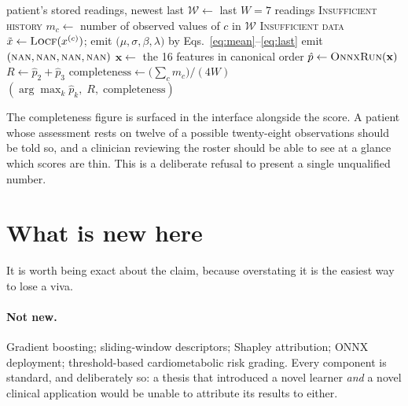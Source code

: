 \documentclass[11pt,a4paper]{article}
\newcommand{\sbp}{\mathrm{sbp}}
\newcommand{\dbp}{\mathrm{dbp}}
\newcommand{\glu}{\mathrm{glu}}
\newcommand{\hr}{\mathrm{hr}}
\begin{document}
\begin{algorithm}[htbp]
\caption{On-device risk assessment}
\label{alg:infer}
\begin{algorithmic}[1]
\Require patient's stored readings, newest last
\State $\mathcal{W} \gets$ last $W=7$ readings
 \State \Return \textsc{Insufficient history} \EndIf
\For{$c \in (\sbp,\dbp,\glu,\hr)$}
  \State $m_c \gets$ number of observed values of $c$ in $\mathcal{W}$
   \State \Return \textsc{Insufficient data} \EndIf
     \State $\tilde x \gets \textsc{Locf}(x^{(c)})$;
            emit $\bigl(\mu,\sigma,\beta,\lambda\bigr)$ by Eqs.~\eqref{eq:mean}--\eqref{eq:last}
  \Else
     \State emit $(\textsc{nan},\textsc{nan},\textsc{nan},\textsc{nan})$
  \EndIf
\EndFor
\State $\mathbf{x} \gets$ the 16 features in canonical order
\State $\hat p \gets \textsc{OnnxRun}(\mathbf{x})$
\State $R \gets \hat p_2 + \hat p_3$ 
\State $\text{completeness} \gets \bigl(\sum_c m_c\bigr) / (4W)$
\State \Return $(\arg\max_k \hat p_k,\; R,\; \text{completeness})$
\end{algorithmic}
\end{algorithm}

The completeness figure is surfaced in the interface alongside the score. A patient
whose assessment rests on twelve of a possible twenty-eight observations should be
told so, and a clinician reviewing the roster should be able to see at a glance
which scores are thin. This is a deliberate refusal to present a single unqualified
number.

\section{What is new here}
\label{sec:novelty}

It is worth being exact about the claim, because overstating it is the easiest way
to lose a viva.

\paragraph{Not new.} Gradient boosting; sliding-window descriptors; Shapley
attribution; ONNX deployment; threshold-based cardiometabolic risk grading. Every
component is standard, and deliberately so: a thesis that introduced a novel
learner \emph{and} a novel clinical application would be unable to attribute its
results to either.
\end{document}
